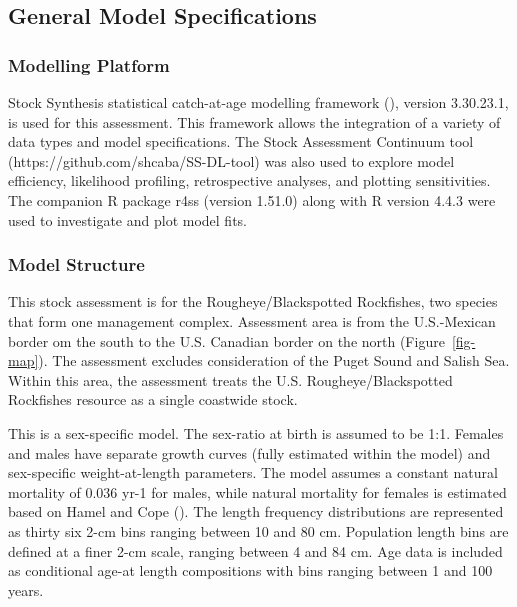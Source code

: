 \documentclass[
]{scrartcl}
\begin{document}
\subsection{General Model
Specifications}\label{general-model-specifications}

\subsubsection{Modelling Platform}\label{modelling-platform}

Stock Synthesis statistical catch-at-age modelling framework
(), version
3.30.23.1, is used for this assessment. This framework allows the
integration of a variety of data types and model specifications. The
Stock Assessment Continuum tool (https://github.com/shcaba/SS-DL-tool)
was also used to explore model efficiency, likelihood profiling,
retrospective analyses, and plotting sensitivities. The companion R
package r4ss (version 1.51.0) along with R version 4.4.3 were used to
investigate and plot model fits.

\subsubsection{Model Structure}\label{model-structure}

This stock assessment is for the Rougheye/Blackspotted Rockfishes, two
species that form one management complex. Assessment area is from the
U.S.-Mexican border om the south to the U.S. Canadian border on the
north (Figure~\ref{fig-map}). The assessment excludes consideration of
the Puget Sound and Salish Sea. Within this area, the assessment treats
the U.S. Rougheye/Blackspotted Rockfishes resource as a single coastwide
stock.

This is a sex-specific model. The sex-ratio at birth is assumed to be
1:1. Females and males have separate growth curves (fully estimated
within the model) and sex-specific weight-at-length parameters. The
model assumes a constant natural mortality of 0.036 yr-1 for males,
while natural mortality for females is estimated based on Hamel and Cope
(). The length frequency
distributions are represented as thirty six 2-cm bins ranging between 10
and 80 cm. Population length bins are defined at a finer 2-cm scale,
ranging between 4 and 84 cm. Age data is included as conditional age-at
length compositions with bins ranging between 1 and 100 years.
\end{document}

